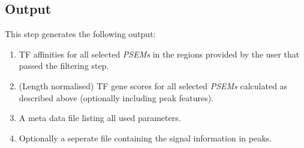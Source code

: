 \documentclass{article}
\begin{document}
\subsection*{Output}
This step generates the following output:
\begin{enumerate}
\item TF affinities for all selected \textit{PSEMs} in the regions provided by the user that passed the filtering step. 
\item (Length normalised) TF gene scores for all selected \textit{PSEMs} calculated as described above (optionally including peak features). 
\item A meta data file listing all used parameters.
\item Optionally a seperate file containing the signal information in peaks. 
\end{enumerate}
\end{document}
